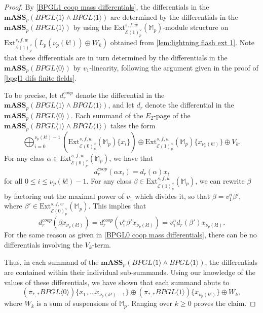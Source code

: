 \documentclass{amsart}
\theoremstyle{plain}
\numberwithin{theorem}{section}
\numberwithin{equation}{section}
\numberwithin{figure}{section}
\newcommand{\0}{\langle 0 \rangle }
\begin{document}
\begin{proof}
    By \cref{BPGL1 coop mass differentials}, the differentials in the $\textbf{mASS}_p(BPGL \langle 1 \rangle \wedge BPGL \langle 1 \rangle)$ are determined by the differentials in the $\textbf{mASS}_p(BPGL \langle 1 \rangle)$ by using the $\text{Ext}_{\mathcal{E}(1)^\vee_p}^{s,f,w}(\mathbb{M}_p)$-module structure on $\text{Ext}_{\mathcal{E}(1)^\vee_p}^{s,f,w}(L_p(\nu_p(k!)) \oplus W_k)$ obtained from \cref{lem:lightning flash ext 1}. Note that these differentials are in turn determined by the differentials in the $\textbf{mASS}_p(BPGL \langle 0 \rangle)$ by $v_1$-linearity, following the argument given in the proof of \cref{bpgl1 difs finite fields}.
    
    To be precise, let $d_r^{coop}$ denote the differential in the $\textbf{mASS}_p(BPGL \langle 1 \rangle \wedge BPGL \langle 1 \rangle )$, and let $d_r$ denote the differential in the $\textbf{mASS}_p(BPGL \langle 0 \rangle)$. Each summand of the $E_2$-page of the $\textbf{mASS}_p(BPGL \langle 1 \rangle \wedge BPGL \langle 1 \rangle)$ takes the form
    \[ \bigoplus_{i =0}^{\nu_p(k!)-1}(\text{Ext}^{s,f,w}_{\mathcal{E}(0)_p^\vee}(\mathbb{M}_p)\{x_{i}\}) \oplus \text{Ext}^{s,f,w}_{\mathcal{E}(1)_p^\vee}(\mathbb{M}_p)\{x_{\nu_p(k!)}\} \oplus V_k.\]   
    For any class $\alpha \in \text{Ext}_{\mathcal{E}(0)^\vee_p}^{s,f,w}(\mathbb{M}_p)$, we have that
    \[d_r^{coop}(\alpha x_{i}) = d_r(\alpha)x_{i}\]
    for all $0 \leq i \leq \nu_p(k!)-1$. For any class $\beta \in \text{Ext}_{\mathcal{E}(1)^\vee_p}^{s,f,w}(\mathbb{M}_p)$, we can rewrite $\beta$ by factoring out the maximal power of $v_1$ which divides it, so that $\beta = v_1^n\beta'$, where $\beta' \in \text{Ext}^{s,f,w}_{\mathcal{E}(0)^\vee_p}(\mathbb{M}_p)$. This implies that
    \[d_r^{coop}(\beta x_{\nu_p(k!)}) = d_r^{coop}(v_1^n\beta' x_{ \nu_p(k!)}) = v_1^nd_r(\beta')x_{ \nu_p(k!)}.\]
    For the same reason as given in \cref{BPGL0 coop mass differentials}, there can be no differentials involving the $V_k$-term.

    Thus, in each summand of the $\textbf{mASS}_p(BPGL \langle 1 \rangle \wedge BPGL \langle 1 \rangle)$, the differentials are contained within their individual sub-summands. Using our knowledge of the values of these differentials, we have shown that each summand abuts to 
    \[(\pi_{*,*}BPGL \langle 0 \rangle)\{x_1, \dots x_{\nu_p(k!)-1}\} \oplus (\pi_{*,*}BPGL \langle 1 \rangle)\{x_{{\nu_p(k!)}}\} \oplus W_k,\]
    where $W_k$ is a sum of suspensions of $\mathbb{M}_p$. Ranging over $k \geq 0$ proves the claim.
\end{proof}
\end{document}
